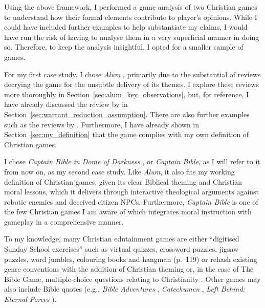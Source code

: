 Using the above framework, I performed a game analysis of two Christian games to understand how their formal elements contribute to player’s opinions. While I could have included further examples to help substantiate my claims, I would have run the risk of having to analyse them in a very superficial manner in doing so. Therefore, to keep the analysis insightful, I opted for a smaller sample of games.

For my first case study, I chose \textit{Alum} \parencite{orsie_alum_2006}, primarily due to the substantial of reviews decrying the game for the unsubtle delivery of its themes. I explore these reviews more thoroughly in Section~\ref{sec:alum_key_observations}, but, for reference, I have already discussed the review by \textcite{arkane_review_2015} in Section~\ref{sec:warrant_reduction_assumption}. There are also further examples such as the reviews by \textcite{adam_review_2015, baxted_review_2015, virotti_review_2017, stranger_review_2015}. Furthermore, I have already shown in Section~\ref{sec:my_definition} that the game complies with my own definition of Christian games.

I chose \textit{Captain Bible in Dome of Darkness} \parencite{engelbrite_captain_1994}, or \textit{Captain Bible}, as I will refer to it from now on, as my second case study. Like \textit{Alum}, it also fits my working definition of Christian games, given its clear Biblical theming and Christian moral lessons, which it delivers through interactive theological arguments against robotic enemies and deceived citizen \acp{NPC}. Furthermore, \textit{Captain Bible} is one of the few Christian games I am aware of which integrates moral instruction with gameplay in a comprehensive manner. 

To my knowledge, many Christian edutainment games are either ``digitised Sunday School exercises'' \parencite[60]{gonzalez_born-again_2014} such as virtual quizzes, crossword puzzles, jigsaw puzzles, word jumbles, colouring books and hangman (p.~119) or rehash existing genre conventions with the addition of Christian theming or, in the case of The Bible Game, multiple-choice questions relating to Christianity \parencite[288--289]{bogost_persuasive_2007}. Other games may also include Bible quotes (e.g., \textit{Bible Adventures} \parencite{wisdom_tree_bible_1991}, \textit{Catechumen} \parencite{bagley_catechumen_2000}, \textit{Left Behind: Eternal Forces} \parencite{inspired_media_entertainment_left_2006}).

